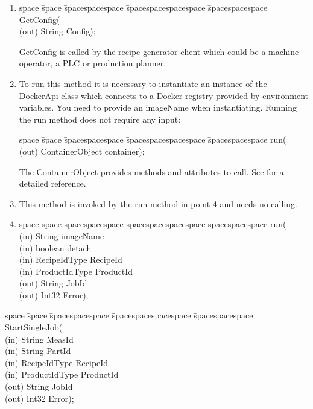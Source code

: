 \begin{enumerate}
    \item \begin{tabbing}
            space \= space \= spacespacespace \= spacespacespacespace \= spacespacespace \kill
            \>  GetConfig(\\
            \>  \>  (out)	 \> 	String           \> Config); 
        \end{tabbing}
        GetConfig is called by the recipe generator client which could be a machine operator, a PLC or production planner.
    \item To run this method it is necessary to instantiate an instance of the DockerApi class which connects to a Docker registry provided by environment variables. You need to provide an imageName when instantiating. Running the run method does not require any input: \begin{tabbing}
    space \= space \= spacespacespace \= spacespacespacespace \= spacespacespace \kill
    \>  run(\\
    \>  \>  (out)	 \> 	ContainerObject           \> container); 
    \end{tabbing}
    The ContainerObject provides methods and attributes to call. See \cite{LastvisitedMay4th2019DockerPython} for a detailed reference.
    \item This method is invoked by the run method in point 4 and needs no calling.
    \item \begin{tabbing}
    space \= space \= spacespacespace \= spacespacespacespace \= spacespacespace \kill
    \>  run(\\
    \>  \>  (in)	 \> 	String          \> imageName\\
    \>  \>  (in)	 \> 	boolean          \> detach\\
    \>  \>  (in)	 \> 	RecipeIdType    \> RecipeId\\
    \>  \>  (in)	 \> 	ProductIdType   \> ProductId\\
    \>  \>  (out)	 \> 	String          \> JobId\\
    \>  \>  (out)	 \> 	Int32           \> Error); 
    \end{tabbing}
\end{enumerate}

\begin{tabbing}
    space \= space \= spacespacespace \= spacespacespacespace \= spacespacespace \kill
    \>  StartSingleJob(\\
    \>  \>  (in)	 \> 	String          \> MeasId\\
    \>  \>  (in)	 \> 	String          \> PartId\\
    \>  \>  (in)	 \> 	RecipeIdType    \> RecipeId\\
    \>  \>  (in)	 \> 	ProductIdType   \> ProductId\\
    \>  \>  (out)	 \> 	String          \> JobId\\
    \>  \>  (out)	 \> 	Int32           \> Error); 
\end{tabbing}




